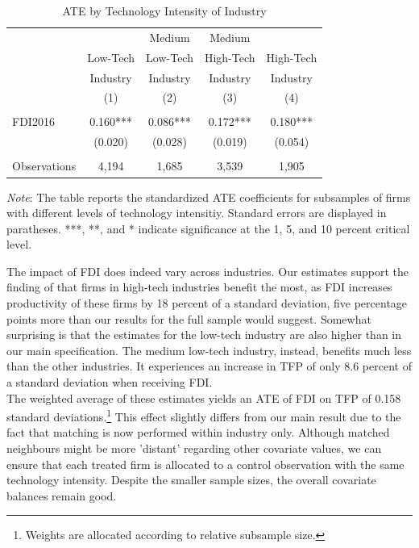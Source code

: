 \documentclass[a4paper,11pt]{scrartcl}
\begin{document}
\begin{table}[h!]
  \centering
   \caption{ATE by Technology Intensity of Industry}
   \label{tab:TECH}
\begin{threeparttable}
 
\begin{tabular}{lcccc}
 \hline
 \hline
 & & Medium & Medium &  \\ 
 & Low-Tech & Low-Tech & High-Tech & High-Tech \\ 
 & Industry & Industry & Industry & Industry \\ 
 & (1) & (2) & (3) & (4) \\
 \hline
 &  &  &  &  \\
FDI2016 & 0.160*** & 0.086*** & 0.172*** & 0.180*** \\
	      & (0.020) & (0.028) & (0.019) & (0.054) \\
	      &  &  &  &  \\
 Observations & 4,194 & 1,685 & 3,539 & 1,905 \\ 
	\hline
	\hline
\end{tabular}	

\begin{tablenotes}[flushleft]
     \footnotesize     
\item \textit{Note}: The table reports the standardized ATE coefficients for subsamples of firms with different levels of technology intensitiy. Standard errors are displayed in paratheses. ***, **, and * indicate significance at the 1, 5, and 10 percent critical level. 

\end{tablenotes}


\end{threeparttable}
\end{table}

The impact of FDI does indeed vary across industries. Our estimates support the finding of \citet{Keller2009} that firms in high-tech industries benefit the most, as FDI increases productivity of these firms by 18 percent of a standard deviation, five percentage points more than our results for the full sample would suggest. Somewhat surprising is that the estimates for the low-tech industry are also higher than in our main specification. The medium low-tech industry, instead, benefits much less than the other industries. It experiences an increase in TFP of only 8.6 percent of a standard deviation when receiving FDI. 
\\
The weighted average of these estimates yields an ATE of FDI on TFP of 0.158 standard deviations.\footnote{Weights are allocated according to relative subsample size.} This effect slightly differs from our main result due to the fact that matching is now performed within industry only. Although matched neighbours might be more 'distant' regarding other covariate values, we can ensure that each treated firm is allocated to a control observation with the same technology intensity. Despite the smaller sample sizes, the overall covariate balances remain good. 
\end{document}
